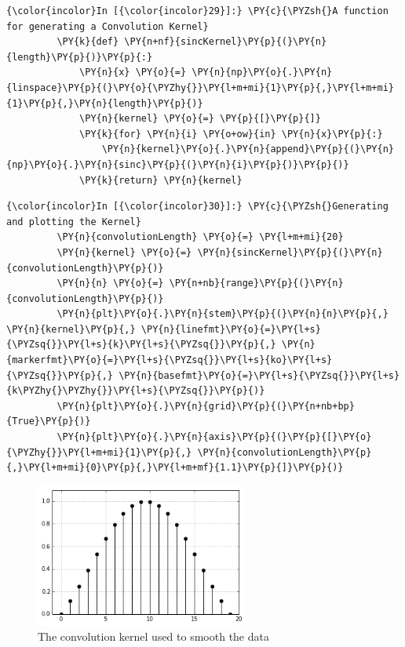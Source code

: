     \begin{Verbatim}[commandchars=\\\{\}]
{\color{incolor}In [{\color{incolor}29}]:} \PY{c}{\PYZsh{}A function for generating a Convolution Kernel}
         \PY{k}{def} \PY{n+nf}{sincKernel}\PY{p}{(}\PY{n}{length}\PY{p}{)}\PY{p}{:}
             \PY{n}{x} \PY{o}{=} \PY{n}{np}\PY{o}{.}\PY{n}{linspace}\PY{p}{(}\PY{o}{\PYZhy{}}\PY{l+m+mi}{1}\PY{p}{,}\PY{l+m+mi}{1}\PY{p}{,}\PY{n}{length}\PY{p}{)}
             \PY{n}{kernel} \PY{o}{=} \PY{p}{[}\PY{p}{]}
             \PY{k}{for} \PY{n}{i} \PY{o+ow}{in} \PY{n}{x}\PY{p}{:}
                 \PY{n}{kernel}\PY{o}{.}\PY{n}{append}\PY{p}{(}\PY{n}{np}\PY{o}{.}\PY{n}{sinc}\PY{p}{(}\PY{n}{i}\PY{p}{)}\PY{p}{)}
             \PY{k}{return} \PY{n}{kernel}
\end{Verbatim}

    \begin{Verbatim}[commandchars=\\\{\}]
{\color{incolor}In [{\color{incolor}30}]:} \PY{c}{\PYZsh{}Generating and plotting the Kernel}
         \PY{n}{convolutionLength} \PY{o}{=} \PY{l+m+mi}{20}
         \PY{n}{kernel} \PY{o}{=} \PY{n}{sincKernel}\PY{p}{(}\PY{n}{convolutionLength}\PY{p}{)}
         \PY{n}{n} \PY{o}{=} \PY{n+nb}{range}\PY{p}{(}\PY{n}{convolutionLength}\PY{p}{)}
         \PY{n}{plt}\PY{o}{.}\PY{n}{stem}\PY{p}{(}\PY{n}{n}\PY{p}{,} \PY{n}{kernel}\PY{p}{,} \PY{n}{linefmt}\PY{o}{=}\PY{l+s}{\PYZsq{}}\PY{l+s}{k}\PY{l+s}{\PYZsq{}}\PY{p}{,} \PY{n}{markerfmt}\PY{o}{=}\PY{l+s}{\PYZsq{}}\PY{l+s}{ko}\PY{l+s}{\PYZsq{}}\PY{p}{,} \PY{n}{basefmt}\PY{o}{=}\PY{l+s}{\PYZsq{}}\PY{l+s}{k\PYZhy{}\PYZhy{}}\PY{l+s}{\PYZsq{}}\PY{p}{)}
         \PY{n}{plt}\PY{o}{.}\PY{n}{grid}\PY{p}{(}\PY{n+nb+bp}{True}\PY{p}{)}
         \PY{n}{plt}\PY{o}{.}\PY{n}{axis}\PY{p}{(}\PY{p}{[}\PY{o}{\PYZhy{}}\PY{l+m+mi}{1}\PY{p}{,} \PY{n}{convolutionLength}\PY{p}{,}\PY{l+m+mi}{0}\PY{p}{,}\PY{l+m+mf}{1.1}\PY{p}{]}\PY{p}{)}
\end{Verbatim}


\begin{figure}[h]
    \begin{center}
        \includegraphics[width = 7cm]{BAK4_final_files/BAK4_final_15_0.png}
        \caption{The convolution kernel used to smooth the data}
        \label{kernel}
    \end{center}
\end{figure}



